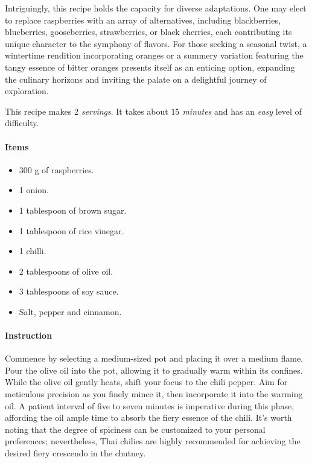 Intriguingly, this recipe holds the capacity for diverse adaptations. One may elect to replace raspberries with an array of alternatives, including blackberries, blueberries, gooseberries, strawberries, or black cherries, each contributing its unique character to the symphony of flavors. For those seeking a seasonal twist, a wintertime rendition incorporating oranges or a summery variation featuring the tangy essence of bitter oranges presents itself as an enticing option, expanding the culinary horizons and inviting the palate on a delightful journey of exploration.

This recipe makes \emph{$2$ servings}. It takes about \emph{$15$ minutes} and has an \emph{easy} level of difficulty. 

\paragraph{Items}
\begin{itemize}[noitemsep]
    \item[\ding{182}] $300$ g of raspberries.
    \item[\ding{183}] 1 onion.
    \item[\ding{184}] 1 tablespoon of brown sugar.
    \item[\ding{185}] 1 tablespoon of rice vinegar.
    \item[\ding{186}] 1 chilli.
    \item[\ding{187}] 2 tablespoons of olive oil.
    \item[\ding{188}] 3 tablespoons of soy sauce.
    \item[\ding{189}] Salt, pepper and cinnamon.
\end{itemize}

\paragraph{Instruction}
Commence by selecting a medium-sized pot and placing it over a medium flame. Pour the olive oil into the pot, allowing it to gradually warm within its confines. While the olive oil gently heats, shift your focus to the chili pepper. Aim for meticulous precision as you finely mince it, then incorporate it into the warming oil. A patient interval of five to seven minutes is imperative during this phase, affording the oil ample time to absorb the fiery essence of the chili. It's worth noting that the degree of spiciness can be customized to your personal preferences; nevertheless, Thai chilies are highly recommended for achieving the desired fiery crescendo in the chutney.

